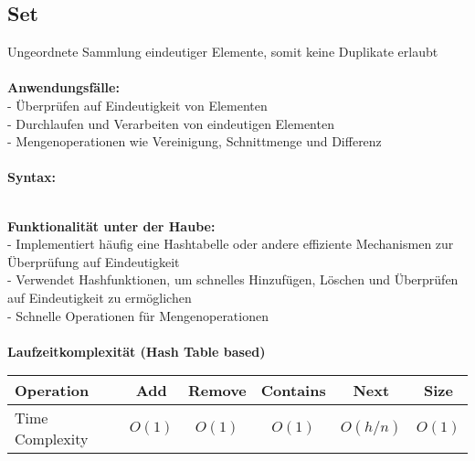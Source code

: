 \documentclass[../main.tex]{subfiles}
\begin{document}
	\subsection{Set}
	Ungeordnete Sammlung eindeutiger Elemente, somit keine Duplikate erlaubt\\\\
	\textbf{Anwendungsfälle:}\\
	- Überprüfen auf Eindeutigkeit von Elementen\\
	- Durchlaufen und Verarbeiten von eindeutigen Elementen\\
	- Mengenoperationen wie Vereinigung, Schnittmenge und Differenz\\\\
	\textbf{Syntax:}
	 
	\\
	\textbf{Funktionalität unter der Haube:}\\
	- Implementiert häufig eine Hashtabelle oder andere effiziente Mechanismen zur Überprüfung auf Eindeutigkeit\\
	- Verwendet Hashfunktionen, um schnelles Hinzufügen, Löschen und Überprüfen auf Eindeutigkeit zu ermöglichen\\
	- Schnelle Operationen für Mengenoperationen\\\\
	\textbf{Laufzeitkomplexität (Hash Table based)}\\
	\begin{table}[ht]
		\centering
		\begin{tabular}{l *{5}{c}}
			\toprule
			Operation & Add & Remove & Contains & Next & Size\\
			\midrule
			Time Complexity & $O(1)$ & $O(1)$ & $O(1)$ & $O(h / n)$ & $O(1)$\\
			\bottomrule
		\end{tabular}
	\end{table}
	\clearpage
	
\end{document}
